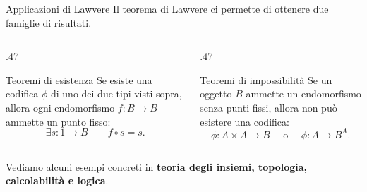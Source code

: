\documentclass[italian,usepdftitle=false]{beamer}
\begin{document}
\begin{frame}{Applicazioni di Lawvere}
  \centering
  Il teorema di Lawvere ci permette di ottenere due famiglie di risultati.\par
  \vspace{2mm}
  \begin{columns}[T,onlytextwidth]
    \begin{column}{.47\textwidth}
      {
      \begin{block}{Teoremi di esistenza}
        Se esiste una codifica $\phi$ di uno dei due tipi visti sopra,
        allora ogni endomorfismo $f:B\to B$ ammette un punto fisso:
        \[
          \exists s : 1 \to B \qquad f \circ s = s.
        \]
      \end{block}
      }
    \end{column}
    \begin{column}{.47\textwidth}
      {
      \begin{block}{Teoremi di impossibilità}
        Se un oggetto $B$ ammette un endomorfismo senza punti fissi, allora non può esistere una codifica:
        \[
          \phi : A \times A \to B \quad\text{ o }\quad \phi : A \to B^A.
        \]
      \end{block}
      }
    \end{column}
  \end{columns}

  \vspace{3mm}
  \begin{center}
    \begin{minipage}{\textwidth}
      \centering\normalsize\color{darkgray}
      Vediamo alcuni esempi concreti in
      \textbf{teoria degli insiemi, topologia, calcolabilità e logica}.
    \end{minipage}
  \end{center}
\end{frame}
\end{document}
